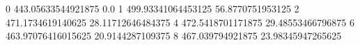 0 443.05633544921875 0.0
1 499.93341064453125 56.8770751953125
2 471.1734619140625 28.11712646484375
4 472.5418701171875 29.48553466796875
6 463.97076416015625 20.9144287109375
8 467.039794921875 23.98345947265625
